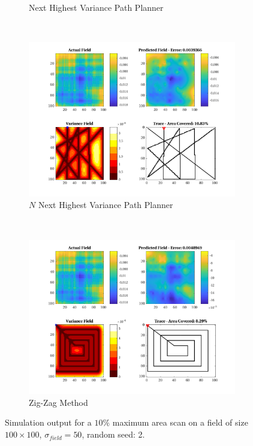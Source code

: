\begin{figure}[htb!]
\begin{subfigure}[t]{0.5\textwidth}
        \captionsetup{skip=0.10\baselineskip,size=footnotesize}
        \caption{Next Highest Variance Path Planner}
    \end{subfigure}%
    \\
    \begin{subfigure}[t]{0.5\textwidth}
        \centering
        \includegraphics[width=\linewidth]{figures/hbresults/nnhv_10p_100x100_sf_50_seed_2.png}
        \captionsetup{skip=0.10\baselineskip,size=footnotesize}
        \caption{$N$ Next Highest Variance Path Planner}
    \end{subfigure}%
    ~
    \begin{subfigure}[t]{0.5\textwidth}
        \centering
        \includegraphics[width=\linewidth]{figures/hbresults/zz_10p_100x100_sf_50_seed_2.png}
        \captionsetup{skip=0.10\baselineskip,size=footnotesize}
        \caption{Zig-Zag Method}
    \end{subfigure}%
    \captionsetup{skip=0.20\baselineskip}
    \caption{Simulation output for a $10\%$ maximum area scan on a field of size $100 \times 100$, $\sigma_{field} = 50$, random seed: 2.}
    \label{fig:sim_sigma50_p10_s2}
\end{figure}

